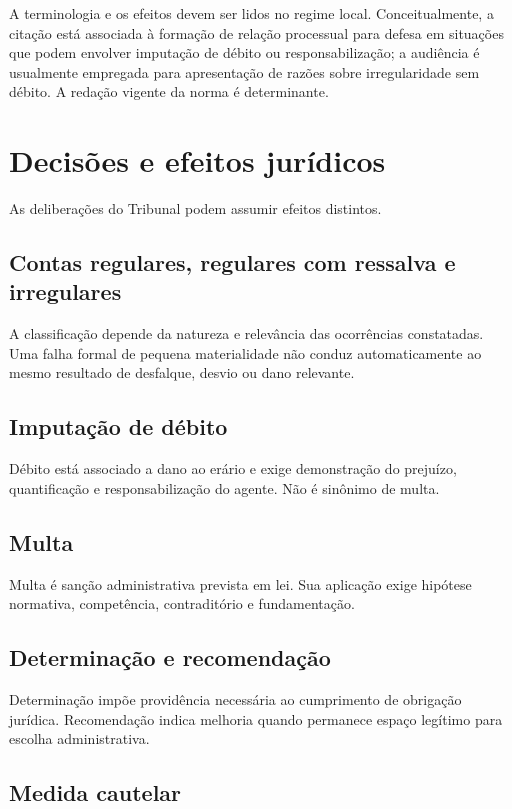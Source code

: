 A terminologia e os efeitos devem ser lidos no regime local. Conceitualmente, a citação está associada à formação de relação processual para defesa em situações que podem envolver imputação de débito ou responsabilização; a audiência é usualmente empregada para apresentação de razões sobre irregularidade sem débito. A redação vigente da norma é determinante.

\section{Decisões e efeitos jurídicos}

As deliberações do Tribunal podem assumir efeitos distintos.

\subsection{Contas regulares, regulares com ressalva e irregulares}

A classificação depende da natureza e relevância das ocorrências constatadas. Uma falha formal de pequena materialidade não conduz automaticamente ao mesmo resultado de desfalque, desvio ou dano relevante.

\subsection{Imputação de débito}

Débito está associado a dano ao erário e exige demonstração do prejuízo, quantificação e responsabilização do agente. Não é sinônimo de multa.

\subsection{Multa}

Multa é sanção administrativa prevista em lei. Sua aplicação exige hipótese normativa, competência, contraditório e fundamentação.

\subsection{Determinação e recomendação}

Determinação impõe providência necessária ao cumprimento de obrigação jurídica. Recomendação indica melhoria quando permanece espaço legítimo para escolha administrativa.

\subsection{Medida cautelar}

